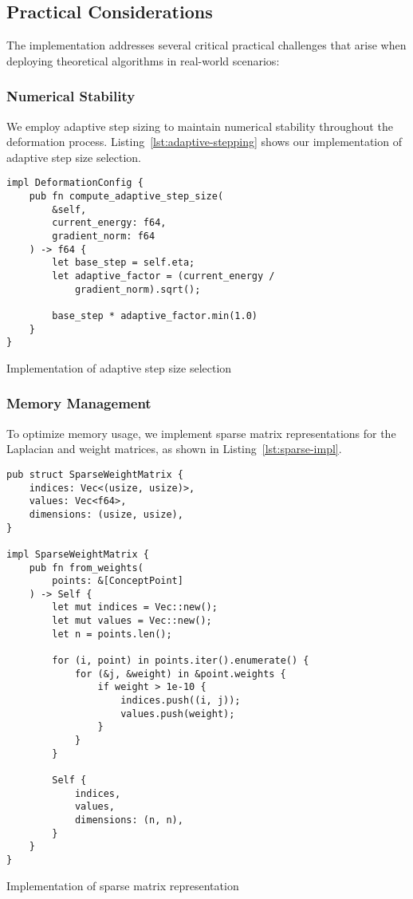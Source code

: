 \documentclass{article}
\begin{document}
\subsection{Practical Considerations}
The implementation addresses several critical practical challenges that arise when deploying theoretical algorithms in real-world scenarios:

\subsubsection{Numerical Stability}
We employ adaptive step sizing to maintain numerical stability throughout the deformation process. Listing~\ref{lst:adaptive-stepping} shows our implementation of adaptive step size selection.

\begin{listing}[h]
\begin{verbatim}
impl DeformationConfig {
    pub fn compute_adaptive_step_size(
        &self,
        current_energy: f64,
        gradient_norm: f64
    ) -> f64 {
        let base_step = self.eta;
        let adaptive_factor = (current_energy / 
            gradient_norm).sqrt();
        
        base_step * adaptive_factor.min(1.0)
    }
}
\end{verbatim}
\caption{Implementation of adaptive step size selection}
\label{lst:adaptive-stepping}
\end{listing}

\subsubsection{Memory Management}
To optimize memory usage, we implement sparse matrix representations for the Laplacian and weight matrices, as shown in Listing~\ref{lst:sparse-impl}.

\begin{listing}[h]
\begin{verbatim}
pub struct SparseWeightMatrix {
    indices: Vec<(usize, usize)>,
    values: Vec<f64>,
    dimensions: (usize, usize),
}

impl SparseWeightMatrix {
    pub fn from_weights(
        points: &[ConceptPoint]
    ) -> Self {
        let mut indices = Vec::new();
        let mut values = Vec::new();
        let n = points.len();
        
        for (i, point) in points.iter().enumerate() {
            for (&j, &weight) in &point.weights {
                if weight > 1e-10 {
                    indices.push((i, j));
                    values.push(weight);
                }
            }
        }
        
        Self {
            indices,
            values,
            dimensions: (n, n),
        }
    }
}
\end{verbatim}
\caption{Implementation of sparse matrix representation}
\label{lst:sparse-impl}
\end{listing}
\end{document}
